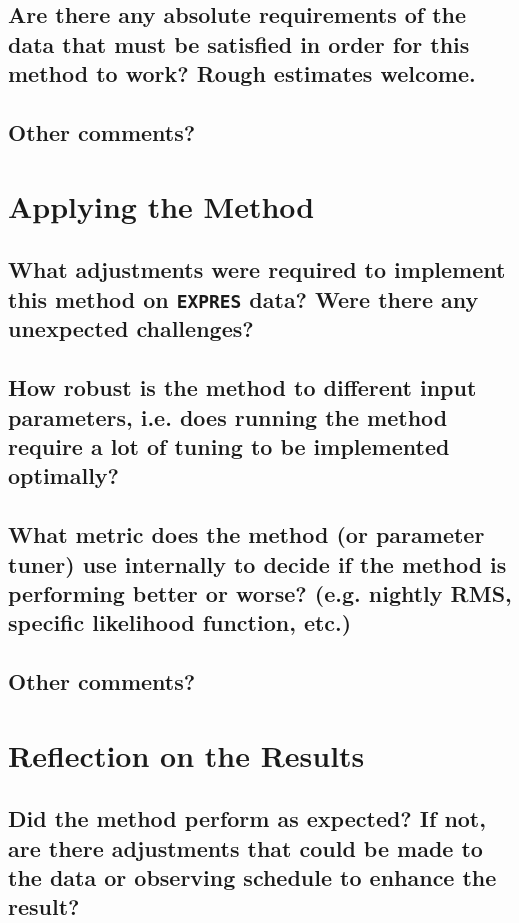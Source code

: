 \documentclass[12pt]{article}
\begin{document}
\subsection{Are there any absolute requirements of the data that must be satisfied in order for this method to work?  Rough estimates welcome.}


\subsection{Other comments?}



\section{Applying the Method}
\subsection{What adjustments were required to implement this method on \texttt{EXPRES} data?  Were there any unexpected challenges?}


\subsection{How robust is the method to different input parameters, i.e. does running the method require a lot of tuning to be implemented optimally?}


\subsection{What metric does the method (or parameter tuner) use internally to decide if the method is performing better or worse?  (e.g. nightly RMS, specific likelihood function, etc.)} 


\subsection{Other comments?}



\section{Reflection on the Results}
\subsection{Did the method perform as expected?  If not, are there adjustments that could be made to the data or observing schedule to enhance the result?}
\end{document}
